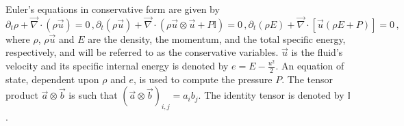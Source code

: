 \documentclass[review,10pt]{elsarticle}
\renewcommand{\div}{\vec{\nabla}\! \cdot \!}
\begin{document}
Euler's equations in conservative form are given by
\begin{subequations}
\label{eq:euler_eq}
%
\begin{equation}
\partial_t \rho  + \div \left( \rho \vec{u} \right) = 0 \,,
\end{equation}
%
\begin{equation}
\partial_t \left( \rho \vec{u} \right) + \div \left( \rho \vec{u} \otimes \vec{u} + P \mathbb{I} \right) = 0  \,,
\end{equation}
%
\begin{equation}
\partial_t \left( \rho E \right) + \div \left[ \vec{u} \left( \rho E + P \right) \right] = 0 \,,
\end{equation}
\end{subequations}
%
where $\rho$, $\rho \vec{u}$ and $E$ are the density, the momentum, and the total specific energy, 
respectively, and will be referred to as the conservative variables. $\vec{u}$ is the fluid's velocity and 
its specific internal energy is denoted by $e=E-\tfrac{u^2}{2}$. An equation of state, dependent upon 
$\rho$ and $e$, is used to compute the pressure $P$. The tensor product $\vec{a} \otimes \vec{b}$ is 
such that $(\vec{a} \otimes \vec{b})_{i,j} = a_i b_j$. The identity tensor is denoted by $\mathbb{I}$.
\end{document}
